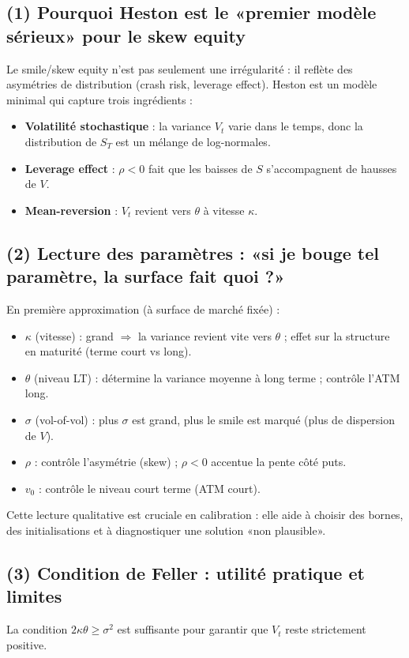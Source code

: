 
\subsection*{(1) Pourquoi Heston est le «premier modèle sérieux» pour le skew equity}
Le smile/skew equity n'est pas seulement une irrégularité : il reflète des asymétries de distribution (crash risk, leverage effect).
Heston est un modèle minimal qui capture trois ingrédients :
\begin{itemize}[leftmargin=*]
\item \textbf{Volatilité stochastique} : la variance $V_t$ varie dans le temps, donc la distribution de $S_T$ est un mélange de log-normales.
\item \textbf{Leverage effect} : $\rho<0$ fait que les baisses de $S$ s'accompagnent de hausses de $V$.
\item \textbf{Mean-reversion} : $V_t$ revient vers $\theta$ à vitesse $\kappa$.
\end{itemize}

\subsection*{(2) Lecture des paramètres : «si je bouge tel paramètre, la surface fait quoi ?»}
En première approximation (à surface de marché fixée) :
\begin{itemize}[leftmargin=*]
\item $\kappa$ (vitesse) : grand $\Rightarrow$ la variance revient vite vers $\theta$ ; effet sur la structure en maturité (terme court vs long).
\item $\theta$ (niveau LT) : détermine la variance moyenne à long terme ; contrôle l'ATM long.
\item $\sigma$ (vol-of-vol) : plus $\sigma$ est grand, plus le smile est marqué (plus de dispersion de $V$).
\item $\rho$ : contrôle l'asymétrie (skew) ; $\rho<0$ accentue la pente côté puts.
\item $v_0$ : contrôle le niveau court terme (ATM court).
\end{itemize}
Cette lecture qualitative est cruciale en calibration : elle aide à choisir des bornes, des initialisations et à diagnostiquer une solution «non plausible».

\subsection*{(3) Condition de Feller : utilité pratique et limites}
La condition $2\kappa\theta\ge\sigma^2$ est suffisante pour garantir que $V_t$ reste strictement positive.
